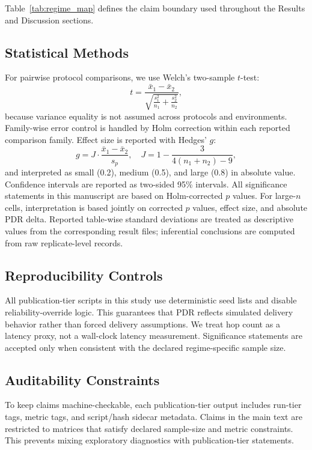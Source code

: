 ﻿\documentclass[sensors,article,submit,moreauthors,pdftex]{Definitions/mdpi}
\begin{document}
Table~\ref{tab:regime_map} defines the claim boundary used throughout the Results and Discussion sections.

\subsection{Statistical Methods}
For pairwise protocol comparisons, we use Welch's two-sample $t$-test:
\begin{equation}
t=\frac{\bar{x}_1-\bar{x}_2}{\sqrt{\frac{s_1^2}{n_1}+\frac{s_2^2}{n_2}}},
\end{equation}
because variance equality is not assumed across protocols and environments. Family-wise error control is handled by Holm correction within each reported comparison family. Effect size is reported with Hedges' $g$:
\begin{equation}
g = J\cdot\frac{\bar{x}_1-\bar{x}_2}{s_p},\quad
J=1-\frac{3}{4(n_1+n_2)-9},
\end{equation}
and interpreted as small (0.2), medium (0.5), and large (0.8) in absolute value. Confidence intervals are reported as two-sided 95\% intervals. All significance statements in this manuscript are based on Holm-corrected $p$ values. For large-$n$ cells, interpretation is based jointly on corrected $p$ values, effect size, and absolute PDR delta. Reported table-wise standard deviations are treated as descriptive values from the corresponding result files; inferential conclusions are computed from raw replicate-level records.

\subsection{Reproducibility Controls}
All publication-tier scripts in this study use deterministic seed lists and disable reliability-override logic. This guarantees that PDR reflects simulated delivery behavior rather than forced delivery assumptions. We treat hop count as a latency proxy, not a wall-clock latency measurement. Significance statements are accepted only when consistent with the declared regime-specific sample size.

\subsection{Auditability Constraints}
To keep claims machine-checkable, each publication-tier output includes run-tier tags, metric tags, and script/hash sidecar metadata. Claims in the main text are restricted to matrices that satisfy declared sample-size and metric constraints. This prevents mixing exploratory diagnostics with publication-tier statements.
\end{document}
